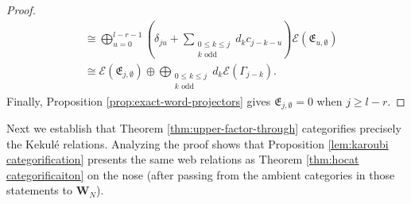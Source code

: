 \documentclass[12pt]{amsart}
\theoremstyle{definition}
\theoremstyle{remark}
\numberwithin{equation}{section}
\numberwithin{figure}{section}
\newcommand{\Web}{\mathbf{W}_N}
\newcommand{\osum}{\bigoplus}
\begin{document}
\begin{proof}
\begin{align*}
&\cong \osum_{u=0}^{l-r-1} \left( \delta_{ju} +  \sum_{\substack{0\leq k\leq j\\k\text{ odd}}} d_kc_{j-k-u} \right)\mathcal E(\mathfrak{E}_{u,\emptyset}) \\
&\cong \mathcal E(\mathfrak{E}_{j,\emptyset}) \oplus \osum_{\substack{0\leq k\leq j\\k\text{ odd}}} d_k\mathcal E(\Gamma_{j-k}).
\end{align*}
Finally, Proposition \ref{prop:exact-word-projectors} gives $\mathfrak{E}_{j,\emptyset}=0$ when $j\geq l-r$.
\end{proof}

Next we establish that Theorem \ref{thm:upper-factor-through} categorifies precisely the Kekulé relations. Analyzing the proof shows that Proposition \ref{lem:karoubi categorification} presents the same web relations as Theorem \ref{thm:hocat categorificaiton} on the nose (after passing from the ambient categories in those statements to $\Web$).
\end{document}
